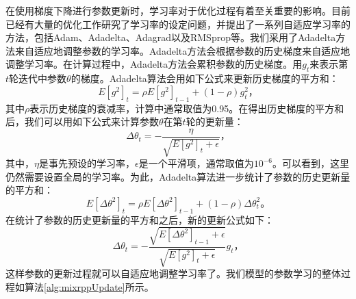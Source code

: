 在使用梯度下降进行参数更新时，学习率对于优化过程有着至关重要的影响。目前已经有大量的优化工作研究了学习率的设定问题，并提出了一系列自适应学习率的方法，包括Adam\citep{kingma2014adam}、Adadelta\citep{zeiler2012adadelta}、Adagrad\citep{duchi2011adaptive}以及RMSprop\citep{tieleman2012lecture}等。我们采用了Adadelta方法来自适应地调整参数的学习率。Adadelta方法会根据参数的历史梯度来自适应地调整学习率。在计算过程中，Adadelta方法会累积参数的历史梯度。用$g_t$来表示第$t$轮迭代中参数$\theta$的梯度。Adadelta算法会用如下公式来更新历史梯度的平方和：
\begin{equation}
\label{eq:adadelta1}
E[g^2]_t=\rho E[g^2]_{t-1}+(1-\rho)g_t^2\text{，}
\end{equation}
其中$\rho$表示历史梯度的衰减率，计算中通常取值为0.95。在得出历史梯度的平方和后，我们可以用如下公式来计算参数$\theta$在第$t$轮的更新量：
\begin{equation}
\Delta\theta_t=-\frac{\eta}{\sqrt{E[g^2]_t+\epsilon}}\text{，}
\end{equation}
其中，$\eta$是事先预设的学习率，$\epsilon$是一个平滑项，通常取值为$10^{-6}$。可以看到，这里仍然需要设置全局的学习率。为此，Adadelta算法进一步统计了参数的历史更新量的平方和：
\begin{equation}
\label{eq:adadelta3}
E[\Delta\theta^2]_t=\rho E[\Delta\theta^2]_{t-1}+(1-\rho)\Delta\theta_t^2\text{。}
\end{equation}
在统计了参数的历史更新量的平方和之后，新的更新公式如下：
\begin{equation}
\label{eq:adadelta2}
\Delta\theta_t=-\frac{\sqrt{E[\Delta\theta^2]_{t-1}+\epsilon}}{\sqrt{E[g^2]_t+\epsilon}}g_t\text{，}
\end{equation}
这样参数的更新过程就可以自适应地调整学习率了。我们模型的参数学习的整体过程如算法\ref{alg:mixrppUpdate}所示。
